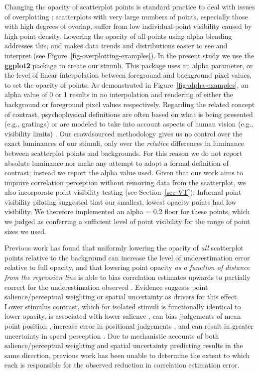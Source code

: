 \documentclass[manuscript, review, anonymous, screen]{acmart}
\begin{document}
Changing the opacity of scatterplot points is standard practice to deal
with issues of overplotting \citep{matejka_2015}; scatterplots with very
large numbers of points, especially those with high degrees of overlap,
suffer from low individual-point visibility caused by high point
density. Lowering the opacity of all points using alpha blending
\citep{few_2008} addresses this, and makes data trends and distributions
easier to see and interpret (see
Figure~\ref{fig-overplotting-examples}). In the present study we use the
\textbf{ggplot2} package \citep{hadley_gg2016} to create our stimuli.
This package uses an alpha parameter, or the level of linear
interpolation \citep{stone_2008} between foreground and background pixel
values, to set the opacity of points. As demonstrated in
Figure~\ref{fig-alpha-examples}, an alpha value of 0 or 1 results in no
interpolation and rendering of either the background or foreground pixel
values respectively. Regarding the related concept of contrast,
psychophysical definitions are often based on what is being presented
(e.g., gratings) or are modeled to take into account aspects of human
vision (e.g., visibility limits) \citep{zuffi_2007}. Our crowdsourced
methodology gives us no control over the exact luminances of our
stimuli, only over the \emph{relative} differences in luminance between
scatterplot points and backgrounds. For this reason we do not report
absolute luminance nor make any attempt to adopt a formal definition of
contrast; instead we report the alpha value used. Given that our work
aims to improve correlation perception without removing data from the
scatterplot, we also incorporate point visibility testing (see
Section~\ref{sec-VT}). Informal point visibility piloting suggested that
our smallest, lowest opacity points had low visibility. We therefore
implemented an alpha = 0.2 floor for these points, which we judged as
conferring a sufficient level of point visibility for the range of point
sizes we used.

Previous work has found that uniformly lowering the opacity of
\emph{all} scatterplot points relative to the background can increase
the level of underestimation error relative to full opacity, and that
lowering point opacity \emph{as a function of distance from the
regression line} is able to bias correlation estimates upwards to
partially correct for the underestimation observed \citep{strain_2023}.
Evidence suggests point salience/perceptual weighting or spatial
uncertainty as drivers for this effect. Lower stimulus contrast, which
for isolated stimuli is functionally identical to lower opacity, is
associated with lower salience \citep{healey_2011}, can bias judgements
of mean point position \citep{hong_2021}, increase error in positional
judgements \citep{wehrhahn_1990}, and can result in greater uncertainty
in speed perception \citep{champion_2017}. Due to mechanistic accounts
of both salience/perceptual weighting and spatial uncertainty predicting
results in the same direction, previous work \citep{strain_2023} has
been unable to determine the extent to which each is responsible for the
observed reduction in correlation estimation error.
\end{document}
